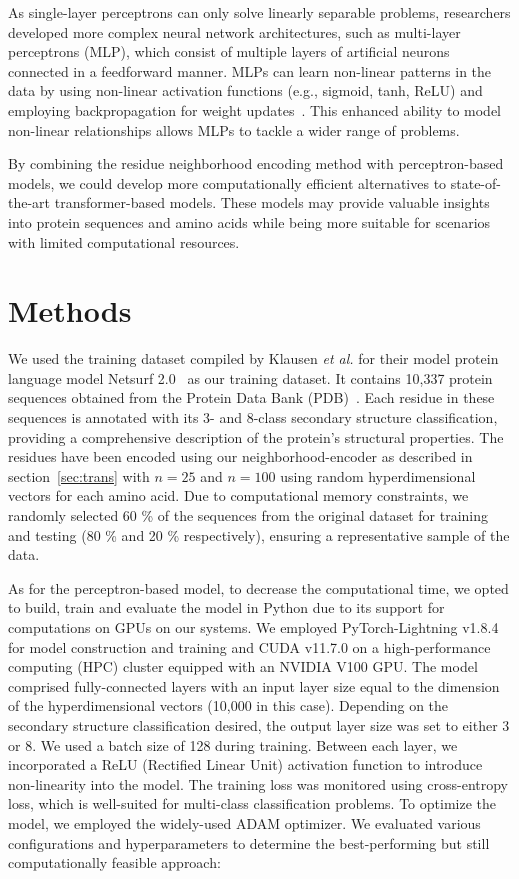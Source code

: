 As single-layer perceptrons can only solve linearly separable problems, researchers developed more complex neural network architectures, such as multi-layer perceptrons (MLP), which consist of multiple layers of artificial neurons connected in a feedforward manner. MLPs can learn non-linear patterns in the data by using non-linear activation functions (e.g., sigmoid, tanh, ReLU) and employing backpropagation for weight updates~\cite{mlp}. This enhanced ability to model non-linear relationships allows MLPs to tackle a wider range of problems.

By combining the residue neighborhood encoding method with perceptron-based models, we could develop more computationally efficient alternatives to state-of-the-art transformer-based models. These models may provide valuable insights into protein sequences and amino acids while being more suitable for scenarios with limited computational resources.

\section{Methods}
We used the training dataset compiled by Klausen \textit{et al.} for their model protein language model Netsurf 2.0~\cite{netsurf} as our training dataset. It contains 10,337 protein sequences obtained from the Protein Data Bank (PDB)~\cite{pdb}. Each residue in these sequences is annotated with its 3- and 8-class secondary structure classification, providing a comprehensive description of the protein's structural properties. The residues have been encoded using our neighborhood-encoder as described in section~\ref{sec:trans} with $n=25$ and $n=100$ using random hyperdimensional vectors for each amino acid. Due to computational memory constraints, we randomly selected 60 \% of the sequences from the original dataset for training and testing (80 \% and 20 \% respectively), ensuring a representative sample of the data.

As for the perceptron-based model, to decrease the computational time, we opted to build, train and evaluate the model in Python due to its support for computations on GPUs on our systems. We employed PyTorch-Lightning v1.8.4 for model construction and training and CUDA v11.7.0 on a high-performance computing (HPC) cluster equipped with an NVIDIA V100 GPU. The model comprised fully-connected layers with an input layer size equal to the dimension of the hyperdimensional vectors (10,000 in this case). Depending on the secondary structure classification desired, the output layer size was set to either 3 or 8. We used a batch size of 128 during training. Between each layer, we incorporated a ReLU (Rectified Linear Unit) activation function to introduce non-linearity into the model. The training loss was monitored using cross-entropy loss, which is well-suited for multi-class classification problems. To optimize the model, we employed the widely-used ADAM optimizer. We evaluated various configurations and hyperparameters to determine the best-performing but still computationally feasible approach:

